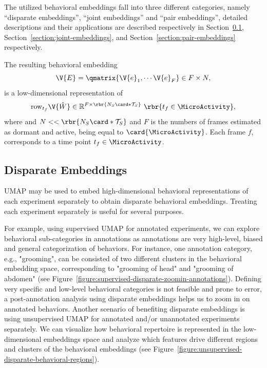 The utilized behavioral embeddings fall into three different categories, namely ``disparate embeddings'', ``joint embeddings'' and ``pair embeddings'', detailed descriptions and their applications are described respectively in  Section~\ref{section:disparate-embeddings}, Section~\ref{section:joint-embeddings}, and  Section~\ref{section:pair-embeddings} respectively.

The resulting behavioral embedding
\begin{equation}
	\V{E}=\qmatrix{\V{e}_1, \cdots \V{e}_{F}} \in F \times N,
\end{equation}
is a low-dimensional representation of
\begin{equation}
	\mathrm{row}_{t_f} \V{\hat{W}} \in \mathbb{R}^{F \times \rbr{ N_S\card*{\mathcal{T}_S}}} \ \rbr{t_f \in \MicroActivity},
\end{equation}
where and $N << \rbr{ N_S\card*{\mathcal{T}_S}}$ and $F$ is the numbers of frames estimated as dormant and active, being equal to $\card{\MicroActivity}$.
Each frame $f$, corresponds to a time point $t_f\in \MicroActivity$.

\subsection{Disparate Embeddings}\label{section:disparate-embeddings}
UMAP may be used to embed high-dimensional behavioral representations of each experiment separately to obtain disparate behavioral embeddings. Treating each experiment separately is useful for several purposes.

For example, using supervised UMAP for annotated experiments, we can explore behavioral sub-categories in annotations as annotations are very high-level, biased and general categorization of behaviors. For instance, one annotation category, e.g., "grooming", can be consisted of two different clusters in the behavioral embedding space, corresponding to "grooming of head" and "grooming of abdomen" (see Figure~\ref{figure:supervised-disparate-zoomin-annotations}).
Defining very specific and low-level behavioral categories is not feasible and prone to error, a post-annotation analysis using disparate embeddings helps us to zoom in on annotated behaviors.
Another scenario of benefiting disparate embeddings is using unsupervised UMAP for annotated and/or unannotated experiments separately.
We can visualize how behavioral repertoire is represented in the low-dimensional embeddings space and analyze which features drive different regions and clusters of the behavioral embeddings (see Figure~\ref{figure:unsupervised-disparate-behavioral-regions}).


